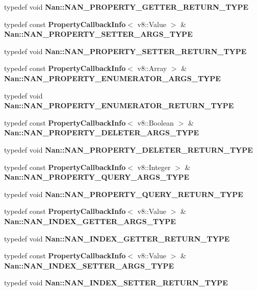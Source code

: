 \begin{DoxyCompactItemize}
\item 
typedef void \textbf{ Nan\+::\+N\+A\+N\+\_\+\+P\+R\+O\+P\+E\+R\+T\+Y\+\_\+\+G\+E\+T\+T\+E\+R\+\_\+\+R\+E\+T\+U\+R\+N\+\_\+\+T\+Y\+PE}
\item 
typedef const \textbf{ Property\+Callback\+Info}$<$ v8\+::\+Value $>$ \& \textbf{ Nan\+::\+N\+A\+N\+\_\+\+P\+R\+O\+P\+E\+R\+T\+Y\+\_\+\+S\+E\+T\+T\+E\+R\+\_\+\+A\+R\+G\+S\+\_\+\+T\+Y\+PE}
\item 
typedef void \textbf{ Nan\+::\+N\+A\+N\+\_\+\+P\+R\+O\+P\+E\+R\+T\+Y\+\_\+\+S\+E\+T\+T\+E\+R\+\_\+\+R\+E\+T\+U\+R\+N\+\_\+\+T\+Y\+PE}
\item 
typedef const \textbf{ Property\+Callback\+Info}$<$ v8\+::\+Array $>$ \& \textbf{ Nan\+::\+N\+A\+N\+\_\+\+P\+R\+O\+P\+E\+R\+T\+Y\+\_\+\+E\+N\+U\+M\+E\+R\+A\+T\+O\+R\+\_\+\+A\+R\+G\+S\+\_\+\+T\+Y\+PE}
\item 
typedef void \textbf{ Nan\+::\+N\+A\+N\+\_\+\+P\+R\+O\+P\+E\+R\+T\+Y\+\_\+\+E\+N\+U\+M\+E\+R\+A\+T\+O\+R\+\_\+\+R\+E\+T\+U\+R\+N\+\_\+\+T\+Y\+PE}
\item 
typedef const \textbf{ Property\+Callback\+Info}$<$ v8\+::\+Boolean $>$ \& \textbf{ Nan\+::\+N\+A\+N\+\_\+\+P\+R\+O\+P\+E\+R\+T\+Y\+\_\+\+D\+E\+L\+E\+T\+E\+R\+\_\+\+A\+R\+G\+S\+\_\+\+T\+Y\+PE}
\item 
typedef void \textbf{ Nan\+::\+N\+A\+N\+\_\+\+P\+R\+O\+P\+E\+R\+T\+Y\+\_\+\+D\+E\+L\+E\+T\+E\+R\+\_\+\+R\+E\+T\+U\+R\+N\+\_\+\+T\+Y\+PE}
\item 
typedef const \textbf{ Property\+Callback\+Info}$<$ v8\+::\+Integer $>$ \& \textbf{ Nan\+::\+N\+A\+N\+\_\+\+P\+R\+O\+P\+E\+R\+T\+Y\+\_\+\+Q\+U\+E\+R\+Y\+\_\+\+A\+R\+G\+S\+\_\+\+T\+Y\+PE}
\item 
typedef void \textbf{ Nan\+::\+N\+A\+N\+\_\+\+P\+R\+O\+P\+E\+R\+T\+Y\+\_\+\+Q\+U\+E\+R\+Y\+\_\+\+R\+E\+T\+U\+R\+N\+\_\+\+T\+Y\+PE}
\item 
typedef const \textbf{ Property\+Callback\+Info}$<$ v8\+::\+Value $>$ \& \textbf{ Nan\+::\+N\+A\+N\+\_\+\+I\+N\+D\+E\+X\+\_\+\+G\+E\+T\+T\+E\+R\+\_\+\+A\+R\+G\+S\+\_\+\+T\+Y\+PE}
\item 
typedef void \textbf{ Nan\+::\+N\+A\+N\+\_\+\+I\+N\+D\+E\+X\+\_\+\+G\+E\+T\+T\+E\+R\+\_\+\+R\+E\+T\+U\+R\+N\+\_\+\+T\+Y\+PE}
\item 
typedef const \textbf{ Property\+Callback\+Info}$<$ v8\+::\+Value $>$ \& \textbf{ Nan\+::\+N\+A\+N\+\_\+\+I\+N\+D\+E\+X\+\_\+\+S\+E\+T\+T\+E\+R\+\_\+\+A\+R\+G\+S\+\_\+\+T\+Y\+PE}
\item 
typedef void \textbf{ Nan\+::\+N\+A\+N\+\_\+\+I\+N\+D\+E\+X\+\_\+\+S\+E\+T\+T\+E\+R\+\_\+\+R\+E\+T\+U\+R\+N\+\_\+\+T\+Y\+PE}

\end{DoxyCompactItemize}
